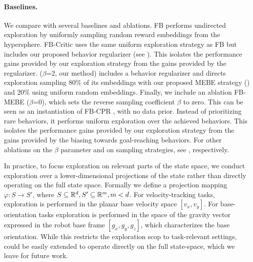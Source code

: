 \paragraph{Baselines.} We compare \method with several baselines and ablations. FB \citep{touati2021learning} performs undirected exploration by uniformly sampling random reward embeddings from the hypersphere. FB-Critic uses the same uniform exploration strategy as FB but includes our proposed behavior regularizer (see ). This isolates the performance gains provided by our exploration strategy from the gains provided by the regularizer. \method ($\beta$=2, our method) includes a behavior regularizer and directs exploration sampling 80\% of its embeddings with our proposed MEBE strategy () and 20\% using uniform random embeddings. Finally, we include an ablation FB-MEBE ($\beta$=0), which sets the reverse sampling coefficient $\beta$ to zero. This can be seen as an instantiation of FB-CPR \citep{tirinzoni2025zeroshot}, with no data prior. Instead of prioritizing rare behaviors, it performs uniform exploration over the achieved behaviors.  This isolates the performance gains provided by our exploration strategy from the gains provided by the biasing towards goal-reaching behaviors. For other ablations on the $\beta$ parameter and on sampling strategies, see , respectively.

In practice, to focus exploration on relevant parts of the state space, we conduct exploration over a lower-dimensional projections of the state rather than directly operating on the full state space. Formally we define a projection mapping $\varphi: S \rightarrow S'$, where $S\subseteq{\mathbb{R}}^d, S' \subseteq {\mathbb{R}}^{m}, m<d$. For velocity-tracking tasks, exploration is performed in the planar base velocity space $\left[v_x, v_y\right]$. For base-orientation tasks exploration is performed in the space of the gravity vector expressed in the robot base frame $\left[g_x, g_y, g_z\right]$, which characterizes the base orientation. While this restricts the exploration scop to task-relevant settings, \method could be easily extended to operate directly on the full state-space, which we leave for future work.  


